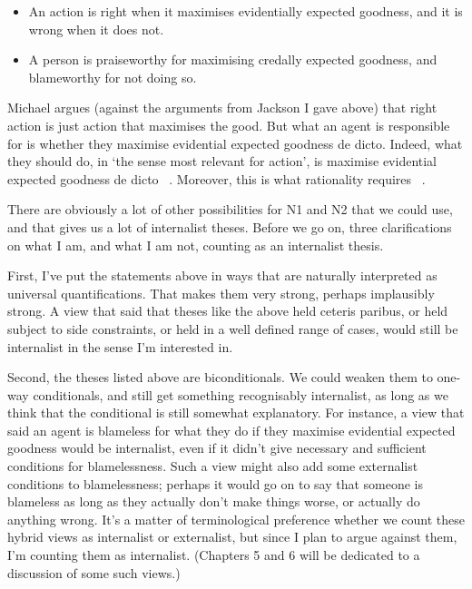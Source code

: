 \begin{itemize}
\item{} An action is right when it maximises evidentially expected goodness, and it is wrong when it does not.

\item{} A person is praiseworthy for maximising credally expected goodness, and blameworthy for not doing so.

\end{itemize}
Michael \citet{Smith2006, Smith2009} argues (against the arguments from Jackson I gave above) that right action is just action that maximises the good. But what an agent is responsible for is whether they maximise evidential expected goodness de dicto. Indeed, what they should do, in `the sense most relevant for action', is maximise evidential expected goodness de dicto ~\citep[144]{Smith2006}. Moreover, this is what rationality requires ~\citep{Smith2009}.

There are obviously a lot of other possibilities for N1 and N2 that we could use, and that gives us a lot of internalist theses. Before we go on, three clarifications on what I am, and what I am not, counting as an internalist thesis.

First, I've put the statements above in ways that are naturally interpreted as universal quantifications. That makes them very strong, perhaps implausibly strong. A view that said that theses like the above held ceteris paribus, or held subject to side constraints, or held in a well defined range of cases, would still be internalist in the sense I'm interested in.

Second, the theses listed above are biconditionals. We could weaken them to one-way conditionals, and still get something recognisably internalist, as long as we think that the conditional is still somewhat explanatory. For instance, a view that said an agent is blameless for what they do if they maximise evidential expected goodness would be internalist, even if it didn't give necessary and sufficient conditions for blamelessness. Such a view might also add some externalist conditions to blamelessness; perhaps it would go on to say that someone is blameless as long as they actually don't make things worse, or actually do anything wrong. It's a matter of terminological preference whether we count these hybrid views as internalist or externalist, but since I plan to argue against them, I'm counting them as internalist. (Chapters 5 and 6 will be dedicated to a discussion of some such views.)

